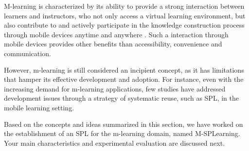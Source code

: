 M-learning is characterized by its ability to provide a strong interaction between learners and instructors, who not only access a virtual learning environment, but also contribute to and actively participate in the knowledge construction process through mobile devices anytime and anywhere \cite{kukulska05}. Such a interaction through mobile devices provides other benefits than accessibility, convenience and communication.

However, m-learning is still considered an incipient concept, as it has limitations that hamper its effective development and adoption. For instance, even with the increasing demand for m-learning applications, few studies have addressed development issues through a strategy of systematic reuse, such as SPL, in the mobile learning setting.  

Based on the concepts and ideas summarized in this section, we have worked on the establishment of an SPL for the m-learning domain, named M-SPLearning. Your main characteristics and experimental evaluation are discussed next.
